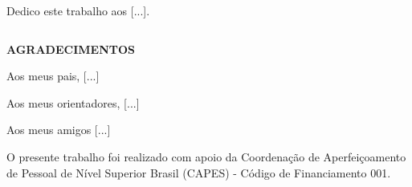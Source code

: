 \frontmatter
\makeinternaltitle

\clearpage\thispagestyle{empty}\null\vfill%

\begin{flushright}
    Dedico este trabalho aos [...].
\end{flushright}

\clearpage\thispagestyle{empty}$\ $%

\clearpage\thispagestyle{empty} \justifying
{}\setlength{\parindent}{\abntindent}\setlength{\parskip}{0.66em}

\begin{center} \bfseries \Large
    AGRADECIMENTOS
\end{center}
\vspace{1em}

\noindent Aos meus pais, [...]

\vspace{1em}

\noindent Aos meus orientadores, [...]

\vspace{1em}

\noindent Aos meus amigos [...]

\vspace{1em}

\noindent O presente trabalho foi realizado com apoio da Coordenação de Aperfeiçoamento de Pessoal de Nível Superior Brasil (CAPES) - Código de Financiamento 001.


\clearpage\thispagestyle{empty}\null\vfill%

